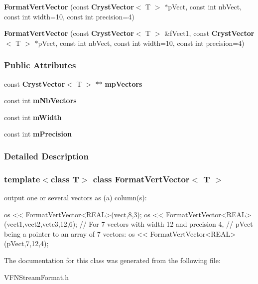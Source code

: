 \begin{DoxyCompactItemize}
\item 
{\bfseries FormatVertVector} (const {\bf CrystVector}$<$ T $>$ $\ast$pVect, const int nbVect, const int width=10, const int precision=4)\label{a00032_affdcb56b538bee3033cf89177e2eaa4e}

\item 
{\bfseries FormatVertVector} (const {\bf CrystVector}$<$ T $>$ \&fVect1, const {\bf CrystVector}$<$ T $>$ $\ast$pVect, const int nbVect, const int width=10, const int precision=4)\label{a00032_a6ca2c9a79903a6d4ba997d413ed8a238}

\end{DoxyCompactItemize}
\subsubsection*{Public Attributes}
\begin{DoxyCompactItemize}
\item 
const {\bf CrystVector}$<$ T $>$ $\ast$$\ast$ {\bfseries mpVectors}\label{a00032_a373ff434e999897fb583bd4534f18167}

\item 
const int {\bfseries mNbVectors}\label{a00032_a4f7519552502a0968432d19fd2b0df4b}

\item 
const int {\bfseries mWidth}\label{a00032_a0ea4d4aae7292f4e5421558156f4ba9e}

\item 
const int {\bfseries mPrecision}\label{a00032_ad64d9a4b653d32862fa7abcc08972249}

\end{DoxyCompactItemize}


\subsubsection{Detailed Description}
\subsubsection*{template$<$class T$>$ class FormatVertVector$<$ T $>$}

output one or several vectors as (a) column(s): 
\begin{DoxyCode}
  os << FormatVertVector<REAL>(vect,8,3);
  os << FormatVertVector<REAL>(vect1,vect2,vetc3,12,6);
  // For 7 vectors with width 12 and precision 4,
  // pVect being a pointer to an array of 7 vectors:
  os << FormatVertVector<REAL>(pVect,7,12,4);
\end{DoxyCode}
 

The documentation for this class was generated from the following file:\begin{DoxyCompactItemize}
\item 
VFNStreamFormat.h\end{DoxyCompactItemize}
